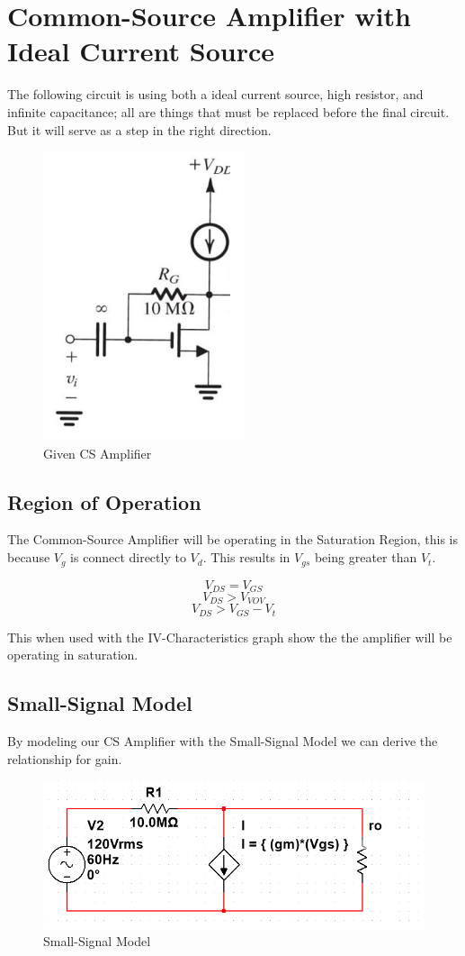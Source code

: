 \documentclass[12pt]{article}
\begin{document}
\section{Common-Source Amplifier with Ideal Current Source}


The following circuit is using both a ideal current source, high resistor, and infinite capacitance; all are things that must be replaced before the final circuit. But it will serve as a step in the right direction.


\begin{figure}[t]
	\label{fig:amp}
	\caption{Given CS Amplifier}
	\centering
	\includegraphics[width=.3\textwidth]{csamplifier}
\end{figure}



\subsection{Region of Operation}
The Common-Source Amplifier will be operating in the Saturation Region, this is because $V_g$ is connect directly to $V_d$. This results in $V_{gs}$ being greater than $V_t$.

$$V_{DS} = V_{GS}$$
$$V_{DS} > V_{VOV}$$
$$V_{DS} > V_{GS} - V_t$$

This when used with the IV-Characteristics graph show the the amplifier will be operating in saturation.

\subsection{Small-Signal Model}
By modeling our CS Amplifier with the Small-Signal Model we can derive the relationship for gain.


\begin{figure}[h]
	\label{fig:amp}
	\caption{Small-Signal Model}
	\centering
	\includegraphics[width=.65\textwidth]{smallsignal}
\end{figure}
\end{document}

